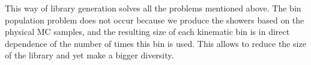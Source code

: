 \begin{figure}
\end{figure}

\begin{figure}
\end{figure}

This way of library generation solves all the problems mentioned above. The bin population problem does not occur because we produce the showers based on the physical MC samples, and the resulting size of each kinematic bin is in direct dependence of the number of times this bin is used. This allows to reduce the size of the library and yet make a bigger diversity.


